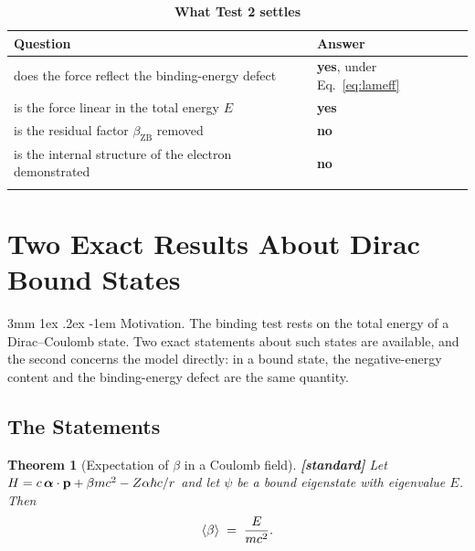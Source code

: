 \documentclass[%
 reprint, amsmath,amssymb, aps, prb, ]{revtex4-2}
\makeatletter
\numberwithin{equation}{section}
\newtheorem{theorem}{Theorem}[section]
\renewcommand\paragraph{%
  \@startsection{paragraph}{4}{\z@}%
    {3mm \@plus 1ex \@minus .2ex}%
    {-1em}%
    {\normalfont\normalsize\itshape}}
\newcommand{\betaZB}{\beta_{\text{ZB}}}
\makeatother
\begin{document}
\begin{table}[t!]
\centering
\caption{\textbf{What Test 2 settles}}
\label{tab:test2}
\renewcommand{\arraystretch}{1.4}
\begin{tabular}{>{\raggedright\arraybackslash}p{4.4cm}>{\raggedright\arraybackslash}p{3.0cm}}
\toprule
\textbf{Question} & \textbf{Answer} \\
\midrule
does the force reflect the binding-energy defect & \textcolor{pass}{\textbf{yes}}, under Eq.~\eqref{eq:lameff} \\
\addlinespace[0.2cm]
is the force linear in the total energy $E$ & \textcolor{pass}{\textbf{yes}} \\
\addlinespace[0.2cm]
is the residual factor $\betaZB$ removed & \textcolor{fail}{\textbf{no}} \\
\addlinespace[0.2cm]
is the internal structure of the electron demonstrated & \textcolor{fail}{\textbf{no}} \\
\addlinespace[0.2cm]
\bottomrule
\end{tabular}
\end{table}

\section{Two Exact Results About Dirac Bound States}
\label{sec:theorems}

\paragraph{Motivation.} The binding test rests on the total energy of a Dirac--Coulomb state. Two exact statements about such states are available, and the second concerns the model directly: in a bound state, the negative-energy content and the binding-energy defect are the same quantity.

\subsection{The Statements}
\label{subsec:theorem}

\begin{theorem}[Expectation of $\beta$ in a Coulomb field]
\label{thm:beta}
\textbf{[standard]} Let $H = c\,\bm{\alpha}\cdot\vb{p} + \beta mc^{2} - Z\alpha\hbar c/r$ and let $\psi$ be a bound eigenstate with eigenvalue $E$. Then
\begin{equation}
\expval{\beta} \;=\; \frac{E}{mc^{2}} .
\label{eq:thm}
\end{equation}
\end{theorem}
\end{document}
